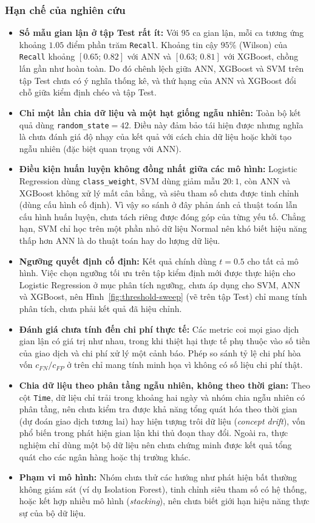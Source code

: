 \subsubsection{Hạn chế của nghiên cứu}
\begin{itemize}
    \item \textbf{Số mẫu gian lận ở tập Test rất ít:} Với $95$ ca gian lận, mỗi ca tương ứng khoảng $1.05$ điểm phần trăm \texttt{Recall}. Khoảng tin cậy $95\%$ (Wilson) của \texttt{Recall} khoảng $[0.65;\, 0.82]$ với ANN và $[0.63;\, 0.81]$ với XGBoost, chồng lấn gần như hoàn toàn. Do đó chênh lệch giữa ANN, XGBoost và SVM trên tập Test chưa có ý nghĩa thống kê, và thứ hạng của ANN và XGBoost đổi chỗ giữa kiểm định chéo và tập Test.

    \item \textbf{Chỉ một lần chia dữ liệu và một hạt giống ngẫu nhiên:} Toàn bộ kết quả dùng \texttt{random\_state}$=42$. Điều này đảm bảo tái hiện được nhưng nghĩa là chưa đánh giá độ nhạy của kết quả với cách chia dữ liệu hoặc khởi tạo ngẫu nhiên (đặc biệt quan trọng với ANN).

    \item \textbf{Điều kiện huấn luyện không đồng nhất giữa các mô hình:} Logistic Regression dùng \texttt{class\_weight}, SVM dùng giảm mẫu $20:1$, còn ANN và XGBoost không xử lý mất cân bằng, và siêu tham số chưa được tinh chỉnh (dùng cấu hình cố định). Vì vậy so sánh ở đây phản ánh cả thuật toán lẫn cấu hình huấn luyện, chưa tách riêng được đóng góp của từng yếu tố. Chẳng hạn, SVM chỉ học trên một phần nhỏ dữ liệu Normal nên khó biết hiệu năng thấp hơn ANN là do thuật toán hay do lượng dữ liệu.

    \item \textbf{Ngưỡng quyết định cố định:} Kết quả chính dùng $t = 0.5$ cho tất cả mô hình. Việc chọn ngưỡng tối ưu trên tập kiểm định mới được thực hiện cho Logistic Regression ở mục phân tích ngưỡng, chưa áp dụng cho SVM, ANN và XGBoost, nên Hình~\ref{fig:threshold-sweep} (vẽ trên tập Test) chỉ mang tính phân tích, chưa phải kết quả đã hiệu chỉnh.

    \item \textbf{Đánh giá chưa tính đến chi phí thực tế:} Các metric coi mọi giao dịch gian lận có giá trị như nhau, trong khi thiệt hại thực tế phụ thuộc vào số tiền của giao dịch và chi phí xử lý một cảnh báo. Phép so sánh tỷ lệ chi phí hòa vốn $c_{FN}/c_{FP}$ ở trên chỉ mang tính minh họa vì không có số liệu chi phí thật.

    \item \textbf{Chia dữ liệu theo phân tầng ngẫu nhiên, không theo thời gian:} Theo cột \texttt{Time}, dữ liệu chỉ trải trong khoảng hai ngày và nhóm chia ngẫu nhiên có phân tầng, nên chưa kiểm tra được khả năng tổng quát hóa theo thời gian (dự đoán giao dịch tương lai) hay hiện tượng trôi dữ liệu (\textit{concept drift}), vốn phổ biến trong phát hiện gian lận khi thủ đoạn thay đổi. Ngoài ra, thực nghiệm chỉ dùng một bộ dữ liệu nên chưa chứng minh được kết quả tổng quát cho các ngân hàng hoặc thị trường khác.

    \item \textbf{Phạm vi mô hình:} Nhóm chưa thử các hướng như phát hiện bất thường không giám sát (ví dụ Isolation Forest), tinh chỉnh siêu tham số có hệ thống, hoặc kết hợp nhiều mô hình (\textit{stacking}), nên chưa biết giới hạn hiệu năng thực sự của bộ dữ liệu.
\end{itemize}